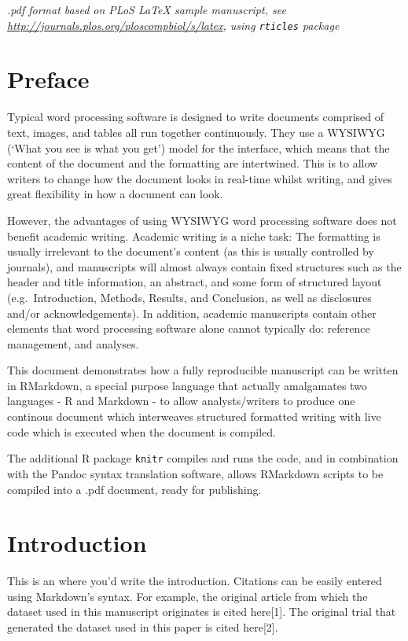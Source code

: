 \documentclass[10pt,letterpaper]{article}
\begin{document}
\emph{.pdf format based on PLoS LaTeX sample manuscript, see
\url{http://journals.plos.org/ploscompbiol/s/latex}, using
\texttt{rticles} package}

\hypertarget{preface}{%
\section{Preface}\label{preface}}

Typical word processing software is designed to write documents
comprised of text, images, and tables all run together continuously.
They use a WYSIWYG (`What you see is what you get') model for the
interface, which means that the content of the document and the
formatting are intertwined. This is to allow writers to change how the
document looks in real-time whilst writing, and gives great flexibility
in how a document can look.

However, the advantages of using WYSIWYG word processing software does
not benefit academic writing. Academic writing is a niche task: The
formatting is usually irrelevant to the document's content (as this is
usually controlled by journals), and manuscripts will almost always
contain fixed structures such as the header and title information, an
abstract, and some form of structured layout (e.g.~Introduction,
Methods, Results, and Conclusion, as well as disclosures and/or
acknowledgements). In addition, academic manuscripts contain other
elements that word processing software alone cannot typically do:
reference management, and analyses.

This document demonstrates how a fully reproducible manuscript can be
written in RMarkdown, a special purpose language that actually
amalgamates two languages - R and Markdown - to allow analysts/writers
to produce one continous document which interweaves structured formatted
writing with live code which is executed when the document is compiled.

The additional R package \texttt{knitr} compiles and runs the code, and
in combination with the Pandoc syntax translation software, allows
RMarkdown scripts to be compiled into a .pdf document, ready for
publishing.

\hypertarget{introduction}{%
\section{Introduction}\label{introduction}}

This is an where you'd write the introduction. Citations can be easily
entered using Markdown's syntax. For example, the original article from
which the dataset used in this manuscript originates is cited
here{[}1{]}. The original trial that generated the dataset used in this
paper is cited here{[}2{]}.
\end{document}
